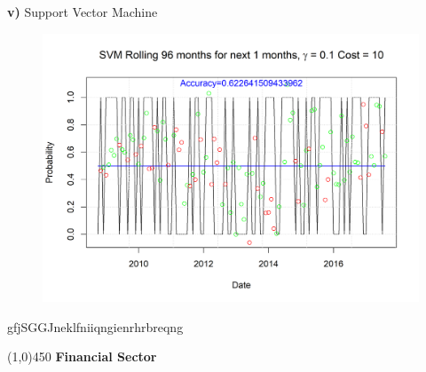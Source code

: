 \documentclass[12pt]{amsart}
\begin{document}
\newpage

\textbf{v)} Support Vector Machine\\

\begin{figure}[htb]
	\includegraphics[scale=0.9]{IYW_SVM_rolling_penalize}
\end{figure}

gfjSGGJneklfniiqngienrhrbreqng

\newpage

\begin{center}
	\line(1,0){450}
	\vskip 8pt \noindent
	{\bf Financial Sector}
\end{center}
\end{document}
